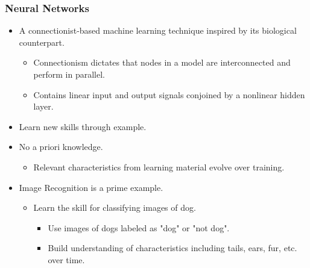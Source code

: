 \documentclass{beamer}
\begin{document}
   \begin{frame}
      \frametitle{Neural Networks}
      \begin{itemize}
        \item A connectionist-based machine learning technique inspired by its biological counterpart.
            \begin{itemize}
               \item Connectionism dictates that nodes in a model are interconnected and perform in parallel.
               \item Contains linear input and output signals conjoined by a nonlinear hidden layer.
            \end{itemize}
         \item Learn new skills through example.
         \item No a priori knowledge.
            \begin{itemize}
               \item Relevant characteristics from learning material evolve over training.
            \end{itemize}
         \item Image Recognition is a prime example.
            \begin{itemize}
               \item Learn the skill for classifying images of dog.
                  \begin{itemize}
                     \item Use images of dogs labeled as "dog" or "not dog".
                     \item Build understanding of characteristics including tails, ears, fur, etc. over time.
                  \end{itemize}
            \end{itemize}
      \end{itemize}
   \end{frame}
\end{document}
